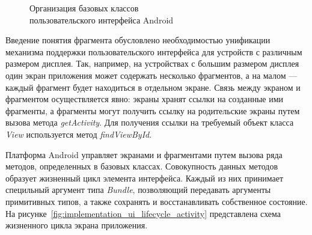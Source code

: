 \begin{figure}[h!]
  \centering
  \caption{Организация базовых классов \\ пользовательского интерфейса Android}
  \label{fig:implementation_ui_hierarchy}
\end{figure}

Введение понятия фрагмента обусловлено необходимостью унификации
механизма поддержки пользовательского интерфейса для устройств с различным
размером дисплея. Так, например, на устройствах с большим размером дисплея
один экран приложения может содержать несколько фрагментов, а на малом ---
каждый фрагмент будет находиться в отдельном экране.
Связь между экраном и фрагментом осуществляется явно:
экраны хранят ссылки на созданные ими фрагменты,
а фрагменты могут получить ссылку на родительские экраны путем
вызова метода \textit{getActivity}.
Для получения ссылки на требуемый объект класса \textit{View}
используется метод \textit{findViewById}.

Платформа Android управляет экранами и фрагментами путем вызова ряда методов,
определенных в базовых классах. Совокупность данных методов образует
жизненный цикл элемента интерфейса. Каждый из них принимает
специльный аргумент типа \textit{Bundle}, позволяющий передавать
аргументы примитивных типов, а также сохранять и восстанавливать
собственное состояние.
На рисунке~\ref{fig:implementation_ui_lifecycle_activity}
представлена схема жизненного цикла экрана приложения.

